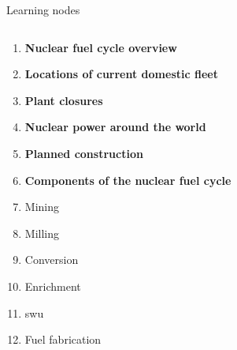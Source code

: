 \documentclass[aspectratio=1610,pdftex,dvipsnames,compress,xcolor={dvipsnames}]{beamer}
\newcommand{\acf}{\acrfull} %
\begin{document}
\begin{frame}{Learning nodes}
    \begin{columns}[t]

        \begin{column}{0.50\textwidth}
            \begin{enumerate}[series=outerlist,topsep=0pt,itemsep=1pt,leftmargin=*,label=(\arabic*)]
                \item[]\textbf{Nuclear fuel cycle overview}
                    \vspace{0.15in}
                \item[]\textbf{Locations of current domestic fleet}
                    \vspace{0.15in}
                \item[]\textbf{Plant closures}
                    \vspace{0.15in}
                \item[]\textbf{Nuclear power around the world}
                    \vspace{0.15in}
                \item[]\textbf{Planned construction}
                    \vspace{0.15in}
                \item[]\textbf{Components of the nuclear fuel cycle}
                \item[]Mining
                \item[]Milling
                \item[]Conversion
                \item[]Enrichment
                \item[]\acf{swu}
                \item[]Fuel fabrication
            \end{enumerate}
        \end{column}


\end{columns}
\end{frame}
\end{document}
